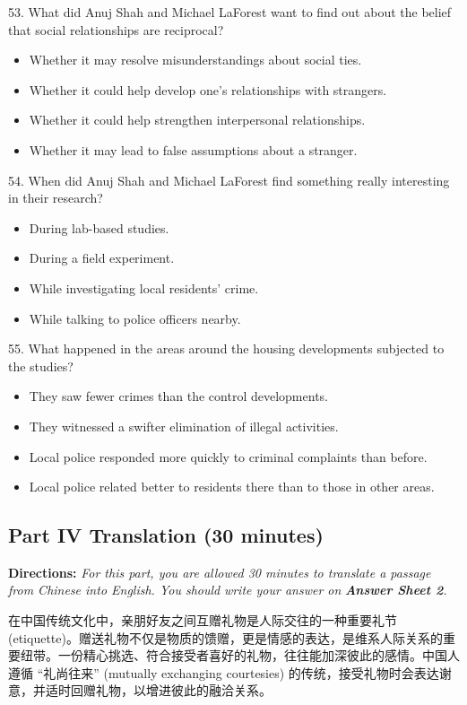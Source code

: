 \documentclass[UTF8,11pt]{ctexart}
\begin{document}
53. What did Anuj Shah and Michael LaForest want to find out about the belief that social relationships are reciprocal?


\begin{itemize}[leftmargin=2em,itemsep=.2em,topsep=.4em]\item[A.] Whether it may resolve misunderstandings about social ties.
\item[B.] Whether it could help develop one’s relationships with strangers.
\item[C.] Whether it could help strengthen interpersonal relationships.
\item[D.] Whether it may lead to false assumptions about a stranger.
\end{itemize}

54. When did Anuj Shah and Michael LaForest find something really interesting in their research?


\begin{itemize}[leftmargin=2em,itemsep=.2em,topsep=.4em]\item[A.] During lab-based studies.
\item[B.] During a field experiment.
\item[C.] While investigating local residents’ crime.
\item[D.] While talking to police officers nearby.
\end{itemize}

55. What happened in the areas around the housing developments subjected to the studies?


\begin{itemize}[leftmargin=2em,itemsep=.2em,topsep=.4em]\item[A.] They saw fewer crimes than the control developments.
\item[B.] They witnessed a swifter elimination of illegal activities.
\item[C.] Local police responded more quickly to criminal complaints than before.
\item[D.] Local police related better to residents there than to those in other areas.
\end{itemize}

\subsection*{\textbf{Part IV Translation (30 minutes)}}


\textbf{Directions: }\textit{For this part, you are allowed 30 minutes to translate a passage from Chinese into English. You should} \textit{write your answer on }\textbf{\textit{Answer Sheet 2}}\textit{.}


在中国传统文化中，亲朋好友之间互赠礼物是人际交往的一种重要礼节 (etiquette)。赠送礼物不仅是物质的馈赠，更是情感的表达，是维系人际关系的重要纽带。一份精心挑选、符合接受者喜好的礼物，往往能加深彼此的感情。中国人遵循 “礼尚往来” (mutually exchanging courtesies) 的传统，接受礼物时会表达谢意，并适时回赠礼物，以增进彼此的融洽关系。
\end{document}
